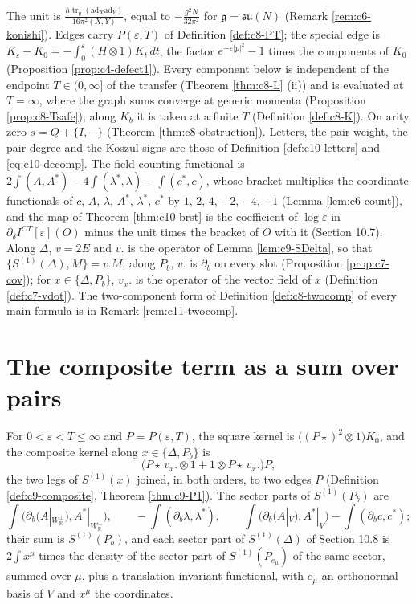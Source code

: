 The unit is $\frac{\hbar\operatorname{tr}_{\mathfrak g}(\mathrm{ad}_X\mathrm{ad}_Y)}{16\pi^2(X,Y)}$, equal to $-\frac{g^2N}{32\pi^2}$ for $\mathfrak g=\mathfrak{su}(N)$ (Remark \ref{rem:c6-konishi}). Edges carry $P(\varepsilon,T)$ of Definition \ref{def:c8-PT}; the special edge is $K_\varepsilon-K_0=-\int_0^\varepsilon(H\otimes1)K_t\,dt$, the factor $e^{-\varepsilon|p|^2}-1$ times the components of $K_0$ (Proposition \ref{prop:c4-defect1}). Every component below is independent of the endpoint $T\in(0,\infty]$ of the transfer (Theorem \ref{thm:c8-L} (ii)) and is evaluated at $T=\infty$, where the graph sums converge at generic momenta (Proposition \ref{prop:c8-Tsafe}); along $K_b$ it is taken at a finite $T$ (Definition \ref{def:c8-K}). On arity zero $s=Q+\{I,-\}$ (Theorem \ref{thm:c8-obstruction}). Letters, the pair weight, the pair degree and the Koszul signs are those of Definition \ref{def:c10-letters} and \eqref{eq:c10-decomp}. The field-counting functional is $2\int(A,A^*)-4\int(\lambda^*,\lambda)-\int(c^*,c)$, whose bracket multiplies the coordinate functionals of $c$, $A$, $\lambda$, $A^*$, $\lambda^*$, $c^*$ by $1$, $2$, $4$, $-2$, $-4$, $-1$ (Lemma \ref{lem:c6-count}), and the map of Theorem \ref{thm:c10-brst} is the coefficient of $\log\varepsilon$ in $\partial_\delta I^{CT}[\varepsilon](O)$ minus the unit times the bracket of $O$ with it (Section 10.7). Along $\Delta$, $v=2E$ and $v.$ is the operator of Lemma \ref{lem:c9-SDelta}, so that $\{S^{(1)}(\Delta),M\}=v.M$; along $P_b$, $v.$ is $\partial_b$ on every slot (Proposition \ref{prop:c7-cov}); for $x\in\{\Delta,P_b\}$, $v_x.$ is the operator of the vector field of $x$ (Definition \ref{def:c7-vdot}). The two-component form of Definition \ref{def:c8-twocomp} of every main formula is in Remark \ref{rem:c11-twocomp}.

\section{The composite term as a sum over pairs}

\begin{definition}
\label{def:c11-kernels}
For $0<\varepsilon<T\le\infty$ and $P=P(\varepsilon,T)$, the square kernel is $\big((P\star)^2\otimes1\big)K_0$, and the composite kernel along $x\in\{\Delta,P_b\}$ is
\[
\big(P\star\,v_x.\otimes1+1\otimes P\star\,v_x.\big)P,
\]
the two legs of $S^{(1)}(x)$ joined, in both orders, to two edges $P$ (Definition \ref{def:c9-composite}, Theorem \ref{thm:c9-P1}). The sector parts of $S^{(1)}(P_b)$ are
\[
\int\big(\partial_b(A|_{W_{\mathbb R}^\perp}),A^*|_{W_{\mathbb R}^\perp}\big),\qquad -\int(\partial_b\lambda,\lambda^*),\qquad \int\big(\partial_b(A|_V),A^*|_V\big)-\int(\partial_bc,c^*);
\]
their sum is $S^{(1)}(P_b)$, and each sector part of $S^{(1)}(\Delta)$ of Section 10.8 is $2\int x^\mu$ times the density of the sector part of $S^{(1)}(P_{e_\mu})$ of the same sector, summed over $\mu$, plus a translation-invariant functional, with $e_\mu$ an orthonormal basis of $V$ and $x^\mu$ the coordinates.
\end{definition}

